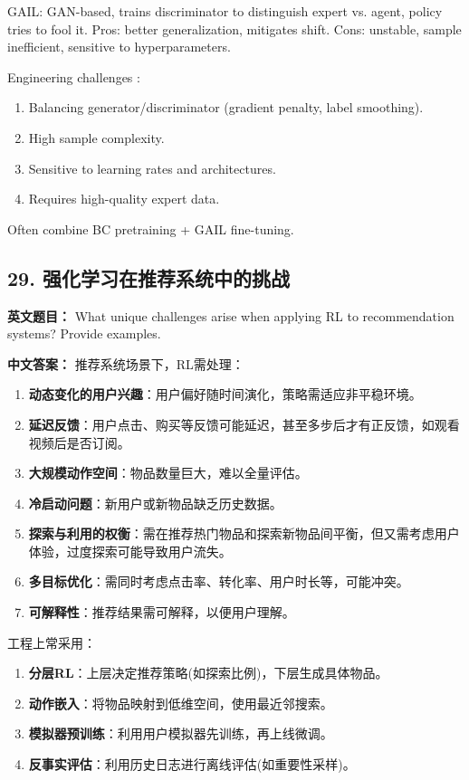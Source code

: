 \documentclass[10pt,a4paper]{ctexart}
\begin{document}
GAIL: GAN-based, trains discriminator to distinguish expert vs. agent, policy tries to fool it. Pros: better generalization, mitigates shift. Cons: unstable, sample inefficient, sensitive to hyperparameters.

 Engineering challenges :
\begin{enumerate}
    \item Balancing generator/discriminator (gradient penalty, label smoothing).
    \item High sample complexity.
    \item Sensitive to learning rates and architectures.
    \item Requires high-quality expert data.
\end{enumerate}

Often combine BC pretraining + GAIL fine-tuning.

\subsection*{29. 强化学习在推荐系统中的挑战}
\textbf{英文题目：} What unique challenges arise when applying RL to recommendation systems? Provide examples.

\textbf{中文答案：}  
推荐系统场景下，RL需处理：
\begin{enumerate}
    \item \textbf{动态变化的用户兴趣}：用户偏好随时间演化，策略需适应非平稳环境。
    \item \textbf{延迟反馈}：用户点击、购买等反馈可能延迟，甚至多步后才有正反馈，如观看视频后是否订阅。
    \item \textbf{大规模动作空间}：物品数量巨大，难以全量评估。
    \item \textbf{冷启动问题}：新用户或新物品缺乏历史数据。
    \item \textbf{探索与利用的权衡}：需在推荐热门物品和探索新物品间平衡，但又需考虑用户体验，过度探索可能导致用户流失。
    \item \textbf{多目标优化}：需同时考虑点击率、转化率、用户时长等，可能冲突。
    \item \textbf{可解释性}：推荐结果需可解释，以便用户理解。
\end{enumerate}

工程上常采用：
\begin{enumerate}
    \item \textbf{分层RL}：上层决定推荐策略(如探索比例)，下层生成具体物品。
    \item \textbf{动作嵌入}：将物品映射到低维空间，使用最近邻搜索。
    \item \textbf{模拟器预训练}：利用用户模拟器先训练，再上线微调。
    \item \textbf{反事实评估}：利用历史日志进行离线评估(如重要性采样)。
\end{enumerate}
\end{document}
